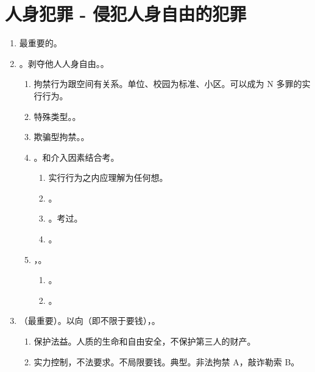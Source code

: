 \section{人身犯罪 - 侵犯人身自由的犯罪}
\begin{enumerate}
  \item 最重要的。
  \item {}。剥夺他人人身自由。。
        \begin{enumerate}
          \item 拘禁行为跟空间有关系。单位、校园为标准、小区。可以成为 N 多罪的实行行为。
          \item 特殊类型。。
          \item 欺骗型拘禁。。
          \item {} \yjt {}。和介入因素结合考。
                \begin{enumerate}
                  \item 实行行为之内应理解为任何想。
                  \item {}。
                  \item {}。考过。
                  \item {}。
                \end{enumerate}
          \item {} \yjt {}，。
                \begin{enumerate}
                  \item {}。
                  \item {}。
                \end{enumerate}
        \end{enumerate}
  \item {}（最重要）。以向（即不限于要钱），。
        \begin{enumerate}
          \item 保护法益。人质的生命和自由安全，不保护第三人的财产。
          \item 实力控制，不法要求。不局限要钱。典型。非法拘禁 A，敲诈勒索 B。

\end{enumerate}
\end{enumerate}
